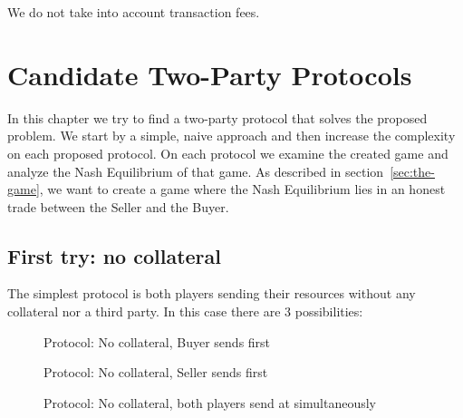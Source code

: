 \documentclass{cacthesis}
\begin{document}
We do not take into account transaction fees. 




\chapter{Candidate Two-Party Protocols}
\label{cha:candidates}
In this chapter we try to find a two-party protocol that solves the proposed problem. We start by a simple, naive approach and then increase the complexity on each proposed protocol. On each protocol we examine the created game and analyze the Nash Equilibrium of that game. As described in section~\ref{sec:the-game}, we want to create a game where the Nash Equilibrium lies in an honest trade between the Seller and the Buyer.

\section{First try: no collateral}
\label{sec:first-try-nocol}
The simplest protocol is both players sending their resources without any collateral nor a third party. In this case there are 3 possibilities:
\begin{figure}[htb!]
    \centering
    \caption{Protocol: No collateral, Buyer sends first}
    \label{pro:naive-Buyer-first}
\end{figure}

\begin{figure}[htb!]
    \centering
    \caption{Protocol: No collateral, Seller sends first}
    \label{pro:naive-Seller-first}
\end{figure}

\begin{figure}[htb!]
    \centering
    \caption{Protocol: No collateral, both players send at simultaneously}
    \label{pro:naive-simultaneous}
\end{figure}
\end{document}
